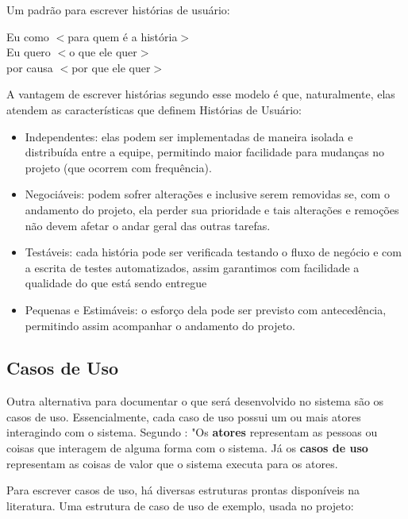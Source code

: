 Um padrão para escrever histórias de usuário\cite{jonathanrasmusson}:

\begin{citacaoLonga}
Eu como $<$para quem é a história$>$
\\
Eu quero $<$o que ele quer$>$
\\
por causa $<$por que ele quer$>$
\end{citacaoLonga}

A vantagem de escrever histórias segundo esse modelo é que, naturalmente, elas atendem as características que definem Histórias de Usuário\cite{jonathanrasmusson}:

\begin{itemize}
    \item Independentes: elas podem ser implementadas de maneira isolada e distribuída entre a equipe, permitindo maior facilidade para mudanças no projeto (que ocorrem com frequência).
    \item Negociáveis: podem sofrer alterações e inclusive serem removidas se, com o andamento do projeto, ela perder sua prioridade e tais alterações e remoções não devem afetar o andar geral das outras tarefas.
    \item Testáveis: cada história pode ser verificada testando o fluxo de negócio e com a escrita de testes automatizados, assim garantimos com facilidade a qualidade do que está sendo entregue
    \item Pequenas e Estimáveis: o esforço dela pode ser previsto com antecedência, permitindo assim acompanhar o andamento do projeto.
\end{itemize}

\subsection{Casos de Uso}
Outra alternativa para documentar o que será desenvolvido no sistema são os casos de uso. Essencialmente, cada caso de uso possui um ou mais atores interagindo com o sistema. Segundo \cite[cap. ~1, p. ~20]{kurtbittnerianspence2002}: "Os \textbf{atores} representam as pessoas ou coisas que interagem de alguma forma com o sistema. Já os \textbf{casos de uso} representam as coisas de valor que o sistema executa para os atores.

Para escrever casos de uso, há diversas estruturas prontas disponíveis na literatura. Uma estrutura de caso de uso de exemplo, usada no projeto\cite{ibm2011}:

